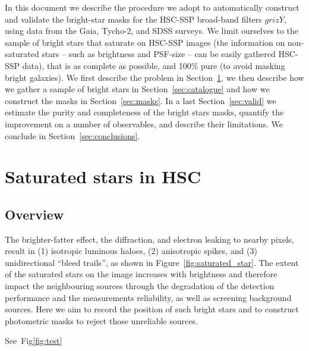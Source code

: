 \documentclass[]{pasj01}
\begin{document}
In this document we describe the procedure we adopt to automatically construct and validate the bright-star masks for the HSC-SSP broad-band filters $grizY$, using data from the Gaia, Tycho-2, and SDSS surveys. We limit ourselves to the sample of bright stars that saturate on HSC-SSP images (the information on non-saturated stars -- such as brightness and PSF-size -- can be easily gathered HSC-SSP data), that is as complete as possible, and 100\% pure (to avoid masking bright galaxies). We first describe the problem in Section~\ref{sec:pb}, we then describe how we gather a sample of bright stars in Section~\ref{sec:catalogue} and how we construct the masks in Section~\ref{sec:masks}. In a last Section~\ref{sec:valid} we estimate the purity and completeness of the bright stars masks, quantify the improvement on a number of observables, and describe their limitations. We conclude in Section~\ref{sec:conclusions}.



\section{Saturated stars in HSC}
\label{sec:pb}

\subsection{Overview}

The brighter-fatter effect, the diffraction, and electron leaking to nearby pixels, result in (1) isotropic luminous haloes, (2) anisotropic spikes, and (3) unidirectional ``bleed trails'', as shown in Figure~\ref{fig:saturated_star}. The extent of the saturated stars on the image increases with brightness and therefore impact the neighbouring sources through the degradation of the detection performance and the measurements reliability, as well as screening background sources. Here we aim to record the position of such bright stars and to construct photometric masks to reject those unreliable sources.
%

See~Fig\ref{fig:test}
\end{document}
